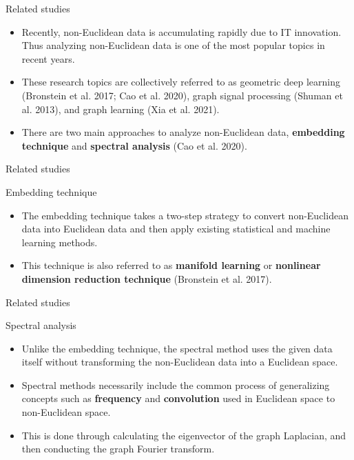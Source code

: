 \documentclass[
  ignorenonframetext,
]{beamer}
\providecommand{\tightlist}{%
  \setlength{\itemsep}{0pt}\setlength{\parskip}{0pt}}\usepackage{longtable,booktabs,array}
\begin{document}
\begin{frame}{Related studies}
\label{related-studies}
\begin{itemize}
\tightlist
\item
  Recently, non-Euclidean data is accumulating rapidly due to IT
  innovation. Thus analyzing non-Euclidean data is one of the most
  popular topics in recent years.
\item
  These research topics are collectively referred to as geometric deep
  learning (Bronstein et al. 2017; Cao et al. 2020), graph signal
  processing (Shuman et al. 2013), and graph learning (Xia et al. 2021).
\item
  There are two main approaches to analyze non-Euclidean data,
  \textbf{embedding technique} and \textbf{spectral analysis} (Cao et
  al. 2020).
\end{itemize}
\end{frame}

\begin{frame}{Related studies}
\label{related-studies-1}
\begin{block}{Embedding technique}
\label{embedding-technique}
\begin{itemize}
\tightlist
\item
  The embedding technique takes a two-step strategy to convert
  non-Euclidean data into Euclidean data and then apply existing
  statistical and machine learning methods.
\item
  This technique is also referred to as \textbf{manifold learning} or
  \textbf{nonlinear dimension reduction technique} (Bronstein et al.
  2017).
\end{itemize}
\end{block}
\end{frame}

\begin{frame}{Related studies}
\label{related-studies-2}
\begin{block}{Spectral analysis}
\label{spectral-analysis}
\begin{itemize}
\tightlist
\item
  Unlike the embedding technique, the spectral method uses the given
  data itself without transforming the non-Euclidean data into a
  Euclidean space.
\item
  Spectral methods necessarily include the common process of
  generalizing concepts such as \textbf{frequency} and
  \textbf{convolution} used in Euclidean space to non-Euclidean space.
\item
  This is done through calculating the eigenvector of the graph
  Laplacian, and then conducting the graph Fourier transform.
\end{itemize}
\end{block}
\end{frame}
\end{document}
